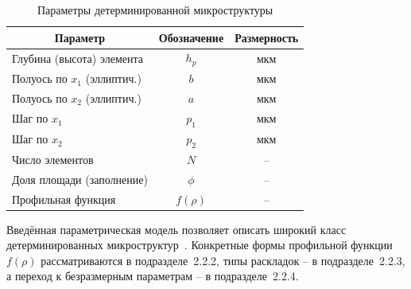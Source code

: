 \begin{table}[!ht]
\centering
\caption{Параметры детерминированной микроструктуры}
\label{tab:texture_params}
\begin{tabularx}{\textwidth}{|X|c|c|}
\hline
\multicolumn{1}{|c|}{\textbf{Параметр}} & \textbf{Обозначение} & \textbf{Размерность} \\
\hline
Глубина (высота) элемента & $h_p$     & мкм \\
\hline
Полуось по $x_1$ (эллиптич.) & $b$    & мкм \\
\hline
Полуось по $x_2$ (эллиптич.) & $a$    & мкм \\
\hline
Шаг по $x_1$              & $p_1$     & мкм \\
\hline
Шаг по $x_2$              & $p_2$     & мкм \\
\hline
Число элементов           & $N$       & --  \\
\hline
Доля площади (заполнение) & $\phi$    & --  \\
\hline
Профильная функция        & $f(\rho)$ & --  \\
\hline
\end{tabularx}
\end{table}


Введённая параметрическая модель позволяет описать широкий класс
детерминированных микроструктур~\cite{senatore2018,joshi2018}. Конкретные формы профильной
функции~$f(\rho)$ рассматриваются в подразделе~2.2.2, типы
раскладок -- в подразделе~2.2.3, а переход к безразмерным
параметрам -- в подразделе~2.2.4.
